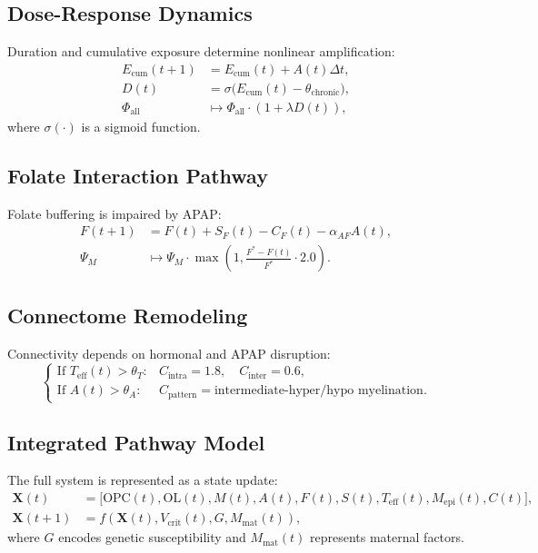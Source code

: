 \documentclass[12pt]{article}
\begin{document}
\subsection{Dose-Response Dynamics}
Duration and cumulative exposure determine nonlinear amplification:
\begin{align}
E_{\text{cum}}(t+1) &= E_{\text{cum}}(t) + A(t) \Delta t, \\
D(t) &= \sigma\big(E_{\text{cum}}(t) - \theta_{\text{chronic}}\big), \\
\Phi_{\text{all}} &\mapsto \Phi_{\text{all}} \cdot \left(1 + \lambda D(t)\right),
\end{align}
where $\sigma(\cdot)$ is a sigmoid function.

\subsection{Folate Interaction Pathway}
Folate buffering is impaired by APAP:
\begin{align}
F(t+1) &= F(t) + S_{F}(t) - C_{F}(t) - \alpha_{AF} A(t), \\
\Psi_{M} &\mapsto \Psi_{M} \cdot \max\!\left(1, \frac{F^{*} - F(t)}{F^{*}} \cdot 2.0\right).
\end{align}

\subsection{Connectome Remodeling}
Connectivity depends on hormonal and APAP disruption:
\[
\begin{cases}
\text{If } T_{\text{eff}}(t) > \theta_{T}: & 
    C_{\text{intra}} = 1.8,\quad C_{\text{inter}} = 0.6, \\
\text{If } A(t) > \theta_{A}: &
    C_{\text{pattern}} = \text{intermediate-hyper/hypo myelination}.
\end{cases}
\]

\subsection{Integrated Pathway Model}
The full system is represented as a state update:
\begin{align}
\mathbf{X}(t) &= \big[\text{OPC}(t), \text{OL}(t), M(t), A(t), F(t), S(t), T_{\text{eff}}(t), M_{\text{epi}}(t), C(t)\big], \\
\mathbf{X}(t+1) &= f\!\left(\mathbf{X}(t), V_{\text{crit}}(t), G, M_{\text{mat}}(t)\right),
\end{align}
where $G$ encodes genetic susceptibility and $M_{\text{mat}}(t)$ represents maternal factors.
\end{document}
